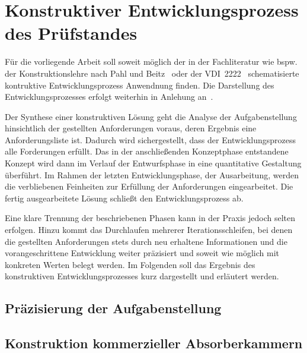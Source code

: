 

\chapter{Konstruktiver Entwicklungsprozess des Prüfstandes}\label{cha:3}

Für die vorliegende Arbeit soll soweit möglich der in der Fachliteratur wie bspw. der Konstruktionslehre nach Pahl und Beitz~\cite{Pahl_Beitz_Konstruktionslehre} oder der VDI~2222~\cite{VDI_2222-1} schematisierte kontruktive Entwicklungsprozess Anwendnung finden. Die Darstellung des Entwicklungsprozesses erfolgt weiterhin in Anlehung an~\cite{Projektarbeit}.
\par
\vspace{\linespace}
Der Synthese einer konstruktiven Lösung geht die Analyse der Aufgabenstellung hinsichtlich der gestellten Anforderungen voraus, deren Ergebnis eine Anforderungsliste ist. Dadurch wird sichergestellt, dass der Entwicklungsprozess alle Forderungen erfüllt. Das in der anschließenden Konzeptphase entstandene Konzept wird dann im Verlauf der Entwurfsphase in eine quantitative Gestaltung überführt. Im Rahmen der letzten Entwicklungsphase, der Ausarbeitung, werden die verbliebenen Feinheiten zur Erfüllung der Anforderungen eingearbeitet. Die fertig ausgearbeitete Lösung schließt den Entwicklungsprozess ab.
\par
\vspace{\linespace}
Eine klare Trennung der beschriebenen Phasen kann in der Praxis jedoch selten erfolgen. Hinzu kommt das Durchlaufen mehrerer Iterationsschleifen, bei denen die gestellten Anforderungen stets durch neu erhaltene Informationen und die vorangeschrittene Entwicklung weiter präzisiert und soweit wie möglich mit konkreten Werten belegt werden. Im Folgenden soll das Ergebnis des konstruktiven Entwicklungsprozesses kurz dargestellt und erläutert werden.   


\section{Präzisierung der Aufgabenstellung}\label{cha:3_Praezisierung_Aufgabenstellung}





\section{Konstruktion kommerzieller Absorberkammern}\label{cha:3_Konstruktion_kommerzieller_Absorberkammern}

